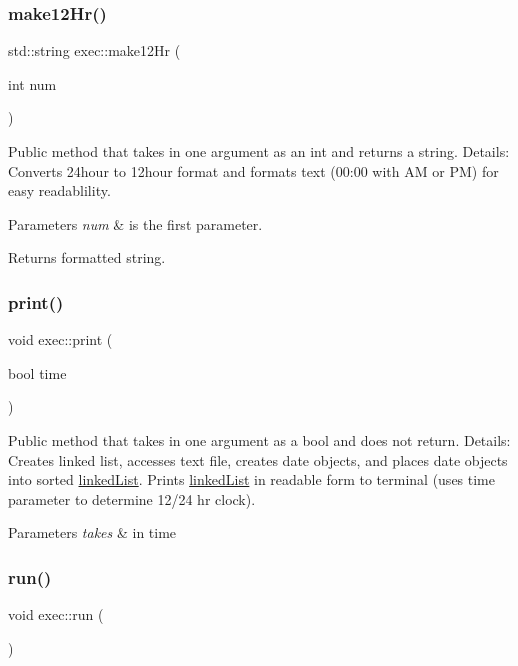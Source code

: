 \subsubsection{\texorpdfstring{make12\+Hr()}{make12Hr()}}
{\footnotesize\ttfamily std\+::string exec\+::make12\+Hr (\begin{DoxyParamCaption}\item[{int}]{num }\end{DoxyParamCaption})}

Public method that takes in one argument as an int and returns a string. Details\+: Converts 24hour to 12hour format and formats text (00\+:00 with AM or PM) for easy readablility. 
\begin{DoxyParams}{Parameters}
{\em num} & is the first parameter. \\
\hline
\end{DoxyParams}
\begin{DoxyReturn}{Returns}
formatted string. 
\end{DoxyReturn}
\mbox{\label{classexec_a4cf771a565711689023aa75141f82c52}} 
\subsubsection{\texorpdfstring{print()}{print()}}
{\footnotesize\ttfamily void exec\+::print (\begin{DoxyParamCaption}\item[{bool}]{time }\end{DoxyParamCaption})}

Public method that takes in one argument as a bool and does not return. Details\+: Creates linked list, accesses text file, creates date objects, and places date objects into sorted \hyperlink{classlinked_list}{linked\+List}. Prints \hyperlink{classlinked_list}{linked\+List} in readable form to terminal (uses time parameter to determine 12/24 hr clock). 
\begin{DoxyParams}{Parameters}
{\em takes} & in time \\
\hline
\end{DoxyParams}
\mbox{\label{classexec_aad3ea9a2cd99fc28471062719b85b1f6}} 
\subsubsection{\texorpdfstring{run()}{run()}}
{\footnotesize\ttfamily void exec\+::run (\begin{DoxyParamCaption}{ }\end{DoxyParamCaption})}

